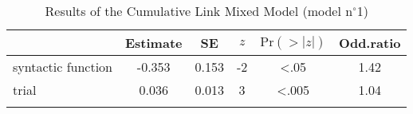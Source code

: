 \begin{table}
\begin{tabular}{l S[table-format=-1.3] S[table-format=1.3] S[table-format=-1] S[table-format=<1.3] S[table-format=1.2]}
  \lsptoprule
 & {Estimate} & {SE} & {$z$} & {$\text{Pr}(>|z|)$} & {Odd.ratio} \\ 
  \midrule
  syntactic function & -0.353 & 0.153 & -2 & <.05 & 1.42 \\ 
  trial & 0.036 & 0.013 & 3 & <.005 & 1.04 \\ 
   \lspbottomrule
\end{tabular}
\caption{Results of the Cumulative Link Mixed Model (model n$^{\circ}$1)}
\label{tab:exp07-m1}
\end{table}
